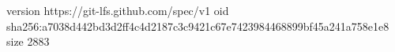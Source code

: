 version https://git-lfs.github.com/spec/v1
oid sha256:a7038d442bd3d2ff4c4d2187c3c9421c67e7423984468899bf45a241a758e1e8
size 2883
